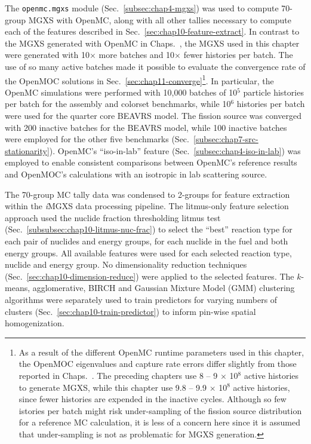 The \texttt{openmc.mgxs} module (Sec.~\ref{subsec:chap4-mgxs}) was used to compute 70-group \ac{MGXS} with OpenMC, along with all other tallies necessary to compute each of the features described in Sec.~\ref{sec:chap10-feature-extract}. In contrast to the \ac{MGXS} generated with OpenMC in Chaps.~, the \ac{MGXS} used in this chapter were generated with 10$\times$ more batches and 10$\times$ fewer histories per batch. The use of so many active batches made it possible to evaluate the convergence rate of the OpenMOC solutions in Sec.~\ref{sec:chap11-converge}\footnote{As a result of the different OpenMC runtime parameters used in this chapter, the OpenMOC eigenvalues and capture rate errors differ slightly from those reported in Chaps.~. The preceding chapters use 8 -- 9 $\times$ 10$^{8}$ active histories to generate \ac{MGXS}, while this chapter use 9.8 -- 9.9 $\times$ 10$^{8}$ active histories, since fewer histories are expended in the inactive cycles. Although so few istories per batch might risk under-sampling of the fission source distribution for a reference \ac{MC} calculation, it is less of a concern here since it is assumed that under-sampling is not as problematic for \ac{MGXS} generation.}. In particular, the OpenMC simulations were performed with 10,000 batches of 10$^{5}$ particle histories per batch for the assembly and colorset benchmarks, while 10$^{6}$ histories per batch were used for the quarter core \ac{BEAVRS} model. The fission source was converged with 200 inactive batches for the \ac{BEAVRS} model, while 100 inactive batches were employed for the other five benchmarks (Sec.~\ref{subsec:chap7-src-stationarity}). OpenMC's ``iso-in-lab'' feature (Sec.~\ref{subsec:chap4-iso-in-lab}) was employed to enable consistent comparisons between OpenMC's reference results and OpenMOC's calculations with an isotropic in lab scattering source.


The 70-group \ac{MC} tally data was condensed to 2-groups for feature extraction within the \textit{i}\ac{MGXS} data processing pipeline. The litmus-only feature selection approach used the nuclide fraction thresholding litmus test (Sec.~\ref{subsubsec:chap10-litmus-nuc-frac}) to select the ``best'' reaction type for each pair of nuclides and energy groups, for each nuclide in the fuel and both energy groups. All available features were used for each selected reaction type, nuclide and energy group. No dimensionality reduction techniques (Sec.~\ref{sec:chap10-dimension-reduce}) were applied to the selected features. The $k$-means, agglomerative, BIRCH and Gaussian Mixture Model (GMM) clustering algorithms were separately used to train predictors for varying numbers of clusters (Sec.~\ref{sec:chap10-train-predictor}) to inform pin-wise spatial homogenization.

